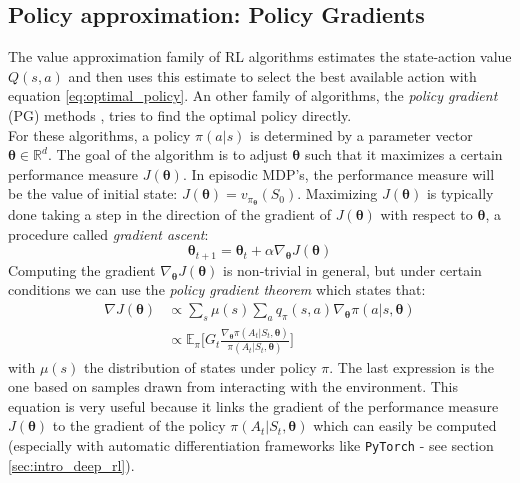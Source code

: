 \subsection{Policy approximation: Policy Gradients}
\label{sec:intro_policy_grads}
The value approximation family of RL algorithms estimates the state-action value $Q(s,a)$ and then uses this estimate to select the best available action with equation \ref{eq:optimal_policy}. An other family of algorithms, the \emph{policy gradient} (PG) methods \cite{sutton2000policy}, tries to find the optimal policy directly.\\

For these algorithms, a policy $\pi(a|s)$ is determined by a parameter vector $\bm{\theta} \in \mathbb{R}^d$. The goal of the algorithm is to adjust $\bm{\theta}$ such that it maximizes a certain performance measure $J(\bm{\theta})$. In episodic MDP's, the performance measure will be the value of initial state: $J(\bm{\theta}) = v_{\pi_{\bm{\theta}}}(S_0)$. Maximizing $J(\bm{\theta})$ is typically done taking a step in the direction of the gradient of  $J(\bm{\theta})$ with respect to $\bm{\theta}$, a procedure called \emph{gradient ascent}:
\begin{equation}
    \label{eqn:grad_ascent}
    \bm{\theta}_{t+1} = \bm{\theta}_{t} + \alpha \nabla_{\bm{\theta}} J(\bm{\theta})
\end{equation}
Computing the gradient $\nabla_{\bm{\theta}} J(\bm{\theta})$ is non-trivial in general, but under certain conditions we can use the \emph{policy gradient theorem} which states that:
\begin{equation}
    \begin{split}
    \nabla J(\bm{\theta}) &\propto \sum_{s} \mu(s) \sum_{a} q_{\pi}(s,a) \nabla_{\bm{\theta}} \pi(a|s, \bm{\theta})\\
                          &\propto \mathbb{E}_{\pi} \Big [ G_t \frac{\nabla_{\bm{\theta}} \pi(A_t|S_t, \bm{\theta})}{\pi(A_t|S_t, \bm{\theta})}\Big]
    \end{split}
    \label{eqn:pol_grad_theorem}
\end{equation}
with $\mu(s)$ the distribution of states under policy $\pi$. The last expression is the one based on samples drawn from interacting with the environment. This equation is very useful because it links the gradient of the performance measure $J(\bm{\theta})$ to the gradient of the policy $\pi(A_t|S_t, \bm{\theta})$ which can easily be computed (especially with automatic differentiation frameworks like {\tt PyTorch} - see section \ref{sec:intro_deep_rl}).\\
